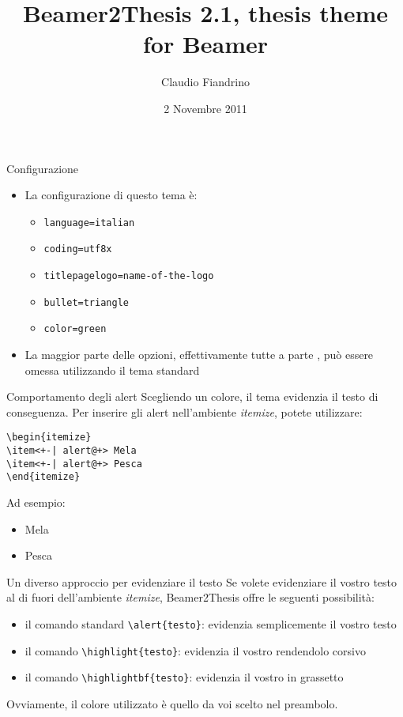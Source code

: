 \documentclass{beamer}
\author{Claudio Fiandrino}
\title{Beamer2Thesis 2.1, thesis theme for Beamer}
\date{2 Novembre 2011}
\begin{document}


\begin{frame}[t,fragile]{Configurazione}
\begin{itemize}
\item La configurazione di questo tema è:
\begin{itemize}
\item \verb!language=italian!
\item \verb!coding=utf8x!
\item \verb!titlepagelogo=name-of-the-logo!
\item \verb!bullet=triangle!
\item \verb!color=green!
\end{itemize}
\item La maggior parte delle opzioni, effettivamente tutte a parte , può essere omessa utilizzando il tema standard
\end{itemize}
\end{frame}

\begin{frame}[fragile]{Comportamento degli alert}
Scegliendo un colore, il tema evidenzia il testo di conseguenza. Per inserire gli alert nell'ambiente \emph{itemize}, potete utilizzare:
\begin{verbatim}
\begin{itemize}
\item<+-| alert@+> Mela
\item<+-| alert@+> Pesca
\end{itemize}
\end{verbatim}
Ad esempio:
\begin{itemize}
\item<+-| alert@+> Mela
\item<+-| alert@+> Pesca
\end{itemize}
\end{frame}

\begin{frame}[fragile]{Un diverso approccio per evidenziare il testo}
Se volete evidenziare il vostro testo al di fuori dell'ambiente \emph{itemize}, Beamer2Thesis offre le seguenti possibilità:
\begin{itemize}
\item il comando standard \verb!\alert{testo}!: evidenzia semplicemente il vostro \alert{testo}
\item il comando \verb!\highlight{testo}!: evidenzia il vostro  rendendolo corsivo
\item il comando \verb!\highlightbf{testo}!: evidenzia il vostro  in grassetto
\end{itemize}
Ovviamente, il colore utilizzato è quello da voi scelto nel preambolo.
\end{frame}


\end{document}
